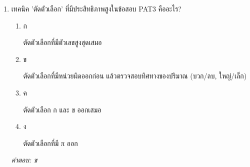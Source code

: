 \documentclass[12pt]{article}
\begin{document}
\begin{enumerate}[label=\arabic*., itemsep=0.5\baselineskip, topsep=0.5\baselineskip, leftmargin=*]
\item เทคนิค 'ตัดตัวเลือก' ที่มีประสิทธิภาพสูงในข้อสอบ PAT3 คืออะไร?
\begin{enumerate}[label=\alph*)., itemsep=0.3\baselineskip, topsep=0.3\baselineskip]
\item ก\ 
\begin{minipage}[t]{0.9\linewidth}
\raggedright ตัดตัวเลือกที่มีตัวเลขสูงสุดเสมอ
\end{minipage}
\item ข\ 
\begin{minipage}[t]{0.9\linewidth}
\raggedright ตัดตัวเลือกที่มีหน่วยผิดออกก่อน แล้วตรวจสอบทิศทางของปริมาณ (บวก/ลบ, ใหญ่/เล็ก)
\end{minipage}
\item ค\ 
\begin{minipage}[t]{0.9\linewidth}
\raggedright ตัดตัวเลือก ก และ ข ออกเสมอ
\end{minipage}
\item ง\ 
\begin{minipage}[t]{0.9\linewidth}
\raggedright ตัดตัวเลือกที่มี π ออก
\end{minipage}
\end{enumerate}
\vspace{-0.3\baselineskip}
\begin{small}
\textit{คำตอบ: ข}
\end{small}

\end{enumerate}
\end{document}
